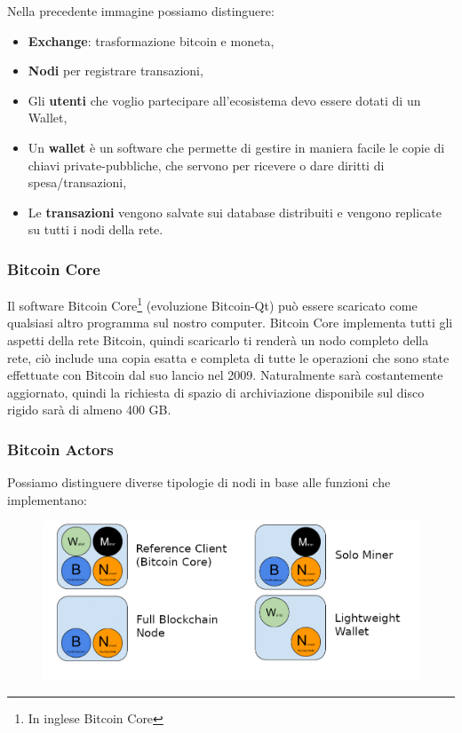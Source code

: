 Nella precedente immagine possiamo distinguere:

\begin{itemize}
    \item \textbf{Exchange}: trasformazione bitcoin e moneta,
    \item \textbf{Nodi} per registrare transazioni,
    \item Gli \textbf{utenti} che voglio partecipare all'ecosistema devo essere
          dotati di un Wallet,
    \item Un \textbf{wallet} è un software che permette
          di gestire in maniera facile le copie di chiavi private-pubbliche, che
          servono per ricevere o dare diritti di spesa/transazioni,
    \item Le \textbf{transazioni} vengono salvate sui database distribuiti e
          vengono replicate su tutti i nodi della rete.
\end{itemize}

\subsubsection{Bitcoin Core}

Il software Bitcoin Core\footnote{In inglese Bitcoin Core
    } (evoluzione Bitcoin-Qt) può essere scaricato come
qualsiasi altro programma sul nostro computer. Bitcoin Core implementa tutti
gli aspetti della rete Bitcoin, quindi scaricarlo ti renderà un nodo
completo della rete, ciò include una copia esatta e completa di tutte le
operazioni che sono state effettuate con Bitcoin dal suo lancio nel 2009.
Naturalmente sarà costantemente aggiornato, quindi la richiesta di spazio di
archiviazione disponibile sul disco rigido sarà di almeno 400 GB.

\subsubsection{Bitcoin Actors}

Possiamo distinguere diverse tipologie di nodi in base alle funzioni che
implementano:

\begin{figure}[H]
    \centering
    \includegraphics[width=15cm, keepaspectratio]{capitoli/bitcoin/imgs/bit33.png}
\end{figure}

